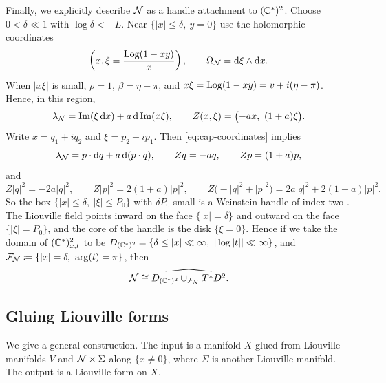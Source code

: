 \documentclass[12pt, letter]{amsart}
\theoremstyle{definition}
\begin{document}
Finally, we explicitly describe  \(\mathcal{N}\) as a handle attachment to  \( (\mathbb{C}^*)^2\).
Choose $0<\delta\ll1$ with $\log\delta<-L$.
Near $\{|x|\le\delta,\ y=0\}$ use the holomorphic coordinates
\[ 
 \left(x, \xi=\frac{\operatorname{Log}(1-xy)}{x} \right), \qquad
\Omega_{\mathcal N}=\mathrm{d}\xi\wedge \mathrm{d} x.
\]
When $|x\xi|$ is small, $\rho=1$, $\beta=\eta-\pi$, and $x\xi=\operatorname{Log}(1-xy)=v+i(\eta-\pi)$.
Hence, in this region,
\begin{equation}\label{eq:cap-coordinates}
 \lN=\Im(\xi\,\dd x)+a\,\dd\Im(x\xi),\qquad Z(x,\xi)=\bigl(-ax,\ (1+a)\xi\bigr).
\end{equation}
Write $x=q_1+iq_2$ and $\xi=p_2+ip_1$.
Then \eqref{eq:cap-coordinates} implies
\[
 \lambda_{\mathcal{N}}=p\cdot \mathrm{d} q+a\,\mathrm{d}(p\cdot q),\qquad Zq=-aq,\qquad Zp=(1+a)p,
\]
and
\[
 Z|q|^2=-2a|q|^2,\qquad Z|p|^2=2(1+a)|p|^2,\qquad
 Z\bigl(-|q|^2+|p|^2\bigr)=2a|q|^2+2(1+a)|p|^2 .
\]
So the box $\{|x|\le\delta,\ |\xi|\le P_0\}$ with $\delta P_0$ small is a Weinstein handle of index two \cite[Chapter~11]{CE}.
The Liouville field points inward on the face $\{|x|=\delta\}$ and outward on the face $\{|\xi|=P_0\}$, and the core of the handle is the disk $\{\xi=0\}$.
Hence if we take the domain of \( (\mathbb{C}^*)^2_{x, t} \) to be \( D_{(\mathbb{C}^*)^2} = \{ \delta \le |x| \ll \infty , \  | \log |t| | \ll \infty   \}\), and \(\mathcal{F}_{\mathcal{N}} \coloneqq \{ |x| = \delta, \ \arg (t) = \pi \} \), then 
\begin{equation}
\label{eq:handle_N}
\mathcal{N} \cong \widehat {D_{(\mathbb{C}^*)^2} \cup_{\mathcal{F}_{\mathcal{N}}} T^*D^2}. 
\end{equation}






\subsection{Gluing Liouville forms}
We give a general construction. 
The input is a manifold $X$ glued from Liouville manifolds $V$ and $\mathcal{N} \times \Sigma$ along $\{x\ne0\}$, where \(\Sigma\) is another Liouville manifold. 
The output is a Liouville form on $X$.
\end{document}
